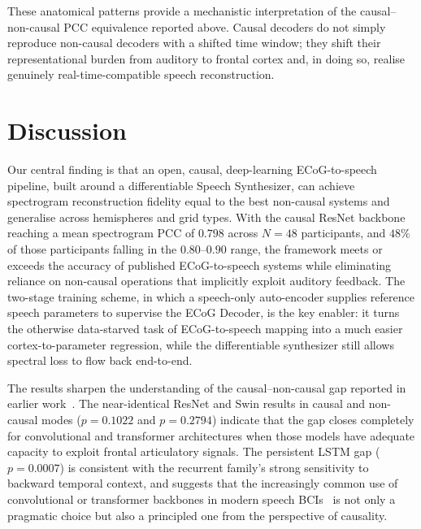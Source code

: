 \documentclass[11pt]{article}
\begin{document}
These anatomical patterns provide a mechanistic interpretation of the
causal--non-causal PCC equivalence reported above. Causal decoders do
not simply reproduce non-causal decoders with a shifted time window;
they shift their representational burden from auditory to frontal cortex
and, in doing so, realise genuinely real-time-compatible speech
reconstruction.

\section{Discussion}

Our central finding is that an open, causal, deep-learning ECoG-to-speech
pipeline, built around a differentiable Speech Synthesizer, can achieve
spectrogram reconstruction fidelity equal to the best non-causal systems
and generalise across hemispheres and grid types. With the causal ResNet
backbone reaching a mean spectrogram PCC of $0.798$ across $N=48$
participants, and $48\%$ of those participants falling in the $0.80$--$0.90$
range, the framework meets or exceeds the accuracy of published
ECoG-to-speech systems while eliminating reliance on non-causal operations
that implicitly exploit auditory feedback. The two-stage training scheme,
in which a speech-only auto-encoder supplies reference speech parameters
to supervise the ECoG Decoder, is the key enabler: it turns the
otherwise data-starved task of ECoG-to-speech mapping into a much easier
cortex-to-parameter regression, while the differentiable synthesizer
still allows spectral loss to flow back end-to-end.

The results sharpen the understanding of the causal--non-causal gap
reported in earlier work~\cite{anumanchipalli2019speech,akbari2019towards,moses2021neuroprosthesis,metzger2023highperformance,silva2024bilingual}.
The near-identical ResNet and Swin results in causal and non-causal modes
($p=0.1022$ and $p=0.2794$) indicate that the gap closes completely for
convolutional and transformer architectures when those models have
adequate capacity to exploit frontal articulatory signals. The persistent
LSTM gap ($p=0.0007$) is consistent with the recurrent family's strong
sensitivity to backward temporal context, and suggests that the
increasingly common use of convolutional or transformer backbones in
modern speech BCIs~\cite{willett2023highperformance,metzger2023highperformance}
is not only a pragmatic choice but also a principled one from the
perspective of causality.
\end{document}
